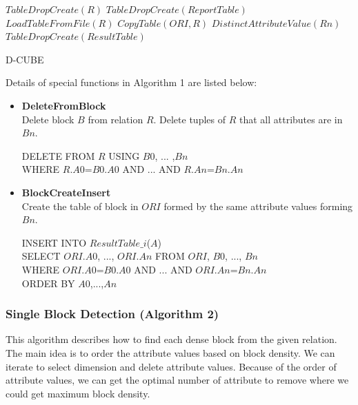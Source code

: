 \begin{algorithm}[H]
\SetAlgoLined
{}
\begin{algorithmic}
 \STATE $TableDropCreate(R)$
 \STATE $TableDropCreate(ReportTable)$
 \STATE $LoadTableFromFile(R)$
 \STATE $CopyTable(ORI, R)$ 
 \STATE {} {
    \STATE $DistinctAttributeValue(Rn)$
 }
 \STATE $TableDropCreate(ResultTable)$ 
 \STATE {}
\end{algorithmic}
 \caption{D-CUBE}
\end{algorithm} 

Details of special functions in Algorithm 1 are listed below:
\begin{itemize}
    \item \textbf{DeleteFromBlock} \\
    Delete block $B$ from relation $R$. Delete tuples of $R$ that all attributes are in $Bn$.
    \begin{algorithmic}
    \STATE DELETE FROM $R$ USING $B0$, ... ,$Bn$ \\
    WHERE $R$.$A0$=$B0$.$A0$ AND ... AND $R$.$An$=$Bn$.$An$
    \end{algorithmic}
    \item \textbf{BlockCreateInsert} \\
    Create the table of block in $ORI$ formed by the same attribute values forming $Bn$.
    \begin{algorithmic}
    \STATE INSERT INTO $ResultTable\_i$($A$) \\
    SELECT $ORI$.$A0$, ..., $ORI$.$An$ FROM $ORI$, $B0$, ..., $Bn$\\
    WHERE $ORI$.$A0$=$B0$.$A0$ AND ... AND $ORI$.$An$=$Bn$.$An$ \\
    ORDER BY $A0$,...,$An$
    \end{algorithmic}
\end{itemize}

\subsubsection{Single Block Detection (Algorithm 2)}
This algorithm describes how to find each dense block from the given relation. The main idea is to order the attribute values based on block density. We can iterate to select dimension and delete attribute values. Because of the order of attribute values, we can get the optimal number of attribute to remove where we could get maximum block density. 

